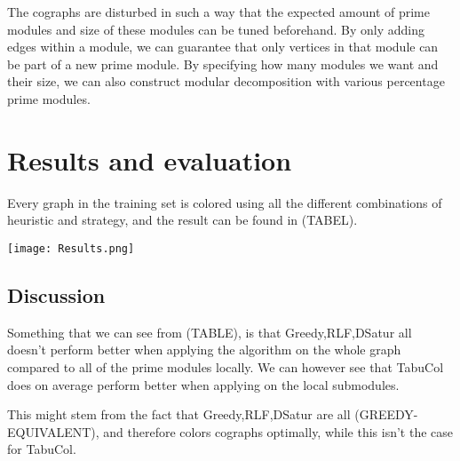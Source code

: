 \documentclass{amsart}
\begin{document}
The cographs are disturbed in such a way that the expected amount of prime
modules and size of these modules can be tuned beforehand. By only adding edges
within a module, we can guarantee that only vertices in that module can be part
of a new prime module. By specifying how many modules we want and their size, we
can also construct modular decomposition with various percentage prime modules.


\section{Results and evaluation}
\label{sec:Result}
Every graph in the training set is colored using all the different combinations
of heuristic and strategy, and the result can be found in (TABEL).

\texttt{[image: Results.png]}


\subsection{Discussion}

Something that we can see from (TABLE), is that Greedy,RLF,DSatur all doesn't
perform better when applying the algorithm on the whole graph compared to all of
the prime modules locally. We can however see that TabuCol does on average
perform better when applying on the local submodules.

This might stem from the fact that Greedy,RLF,DSatur are all
(GREEDY-EQUIVALENT), and therefore colors cographs optimally, while this isn't
the case for TabuCol.

\printbibliography
\end{document}
